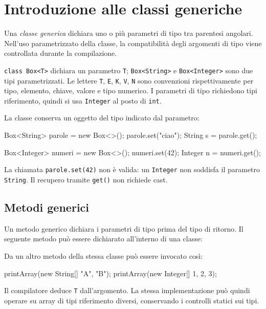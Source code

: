 \section{Introduzione alle classi generiche}
\label{sec:fi-java-interfacce-generici}

\begin{definition}
\label{def:fi-java-interfacce-generici}
Una \emph{classe generica} dichiara uno o più parametri di tipo
tra parentesi angolari. Nell'uso parametrizzato della classe,
la compatibilità degli argomenti di tipo viene controllata
durante la compilazione.
\end{definition}

\lstinline|class Box<T>| dichiara un parametro \texttt{T};
\lstinline|Box<String>| e \lstinline|Box<Integer>| sono due
tipi parametrizzati. Le lettere \texttt{T}, \texttt{E},
\texttt{K}, \texttt{V}, \texttt{N} sono convenzioni rispettivamente
per tipo, elemento, chiave, valore e tipo numerico. I parametri
di tipo richiedono tipi riferimento, quindi si usa
\texttt{Integer} al posto di \texttt{int}.

\begin{example}
La classe conserva un oggetto del tipo indicato dal parametro:

\noindent
\begin{minipage}{\linewidth}

\end{minipage}

\begin{unipdcode}[language=Java]
Box<String> parole = new Box<>();
parole.set("ciao");
String s = parole.get();

Box<Integer> numeri = new Box<>();
numeri.set(42);
Integer n = numeri.get();
\end{unipdcode}

La chiamata \texttt{parole.set(42)} non è valida: un
\texttt{Integer} non soddisfa il parametro \texttt{String}.
Il recupero tramite \texttt{get()} non richiede cast.
\end{example}

\subsection{Metodi generici}
\label{sec:fi-java-interfacce-metodi-generici}

Un metodo generico dichiara i parametri di tipo prima del tipo
di ritorno. Il seguente metodo può essere dichiarato all'interno
di una classe:



Da un altro metodo della stessa classe può essere invocato così:

\begin{unipdcode}[language=Java]
printArray(new String[] {"A", "B"});
printArray(new Integer[] {1, 2, 3});
\end{unipdcode}

Il compilatore deduce \texttt{T} dall'argomento. La stessa
implementazione può quindi operare su array di tipi riferimento
diversi, conservando i controlli statici sui tipi.
